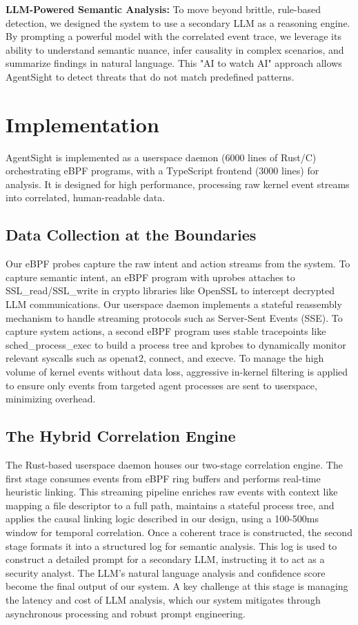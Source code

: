 \textbf{LLM-Powered Semantic Analysis:} To move beyond brittle, rule-based detection, we designed the system to use a secondary LLM as a reasoning engine. By prompting a powerful model with the correlated event trace, we leverage its ability to understand semantic nuance, infer causality in complex scenarios, and summarize findings in natural language. This "AI to watch AI" approach allows AgentSight to detect threats that do not match predefined patterns.

\section{Implementation}

AgentSight is implemented as a userspace daemon (6000 lines of Rust/C) orchestrating eBPF programs, with a TypeScript frontend (3000 lines) for analysis. It is designed for high performance, processing raw kernel event streams into correlated, human-readable data.

\subsection{Data Collection at the Boundaries}

Our eBPF probes capture the raw intent and action streams from the system. To capture semantic intent, an eBPF program with uprobes attaches to SSL\_read/SSL\_write in crypto libraries like OpenSSL to intercept decrypted LLM communications. Our userspace daemon implements a stateful reassembly mechanism to handle streaming protocols such as Server-Sent Events (SSE). To capture system actions, a second eBPF program uses stable tracepoints like sched\_process\_exec to build a process tree and kprobes to dynamically monitor relevant syscalls such as openat2, connect, and execve. To manage the high volume of kernel events without data loss, aggressive in-kernel filtering is applied to ensure only events from targeted agent processes are sent to userspace, minimizing overhead.

\subsection{The Hybrid Correlation Engine}

The Rust-based userspace daemon houses our two-stage correlation engine. The first stage consumes events from eBPF ring buffers and performs real-time heuristic linking. This streaming pipeline enriches raw events with context like mapping a file descriptor to a full path, maintains a stateful process tree, and applies the causal linking logic described in our design, using a 100-500ms window for temporal correlation. Once a coherent trace is constructed, the second stage formats it into a structured log for semantic analysis. This log is used to construct a detailed prompt for a secondary LLM, instructing it to act as a security analyst. The LLM's natural language analysis and confidence score become the final output of our system. A key challenge at this stage is managing the latency and cost of LLM analysis, which our system mitigates through asynchronous processing and robust prompt engineering.

